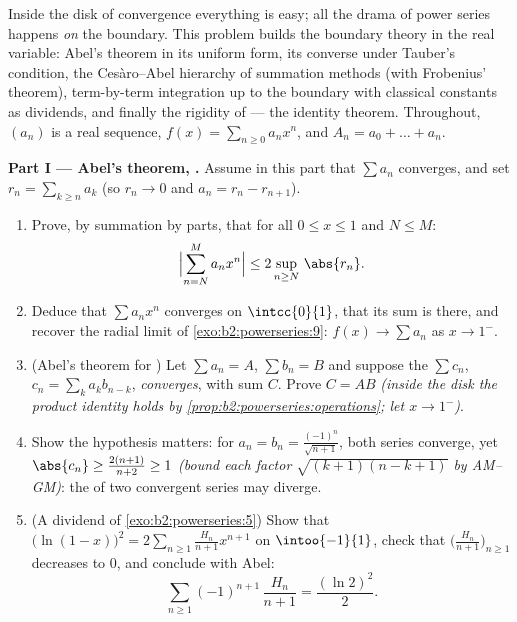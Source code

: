 \begin{problem}\label{pb:b2:powerseries:1}
Inside the disk of convergence everything is easy; all the
drama of power series happens \emph{on} the boundary. This
problem builds the boundary theory in the real variable: Abel's
theorem in its uniform form, its converse under Tauber's
condition, the Ces\`aro--Abel hierarchy of summation methods
(with Frobenius' theorem), term-by-term integration up to the
boundary with classical constants as dividends, and finally the
rigidity of  --- the identity
theorem.
Throughout, $(a_n)$ is a real sequence, $f(x) = \sum_{n\geq0}
a_nx^n$, and $A_n = a_0 + \dots + a_n$.

\medskip
\noindent\textbf{Part I --- Abel's theorem, .} Assume
in this part that $\sum a_n$ converges, and set $r_n =
\sum_{k\geq n} a_k$ (so $r_n \to 0$ and $a_n = r_n -
r_{n+1}$).
\begin{enumerate}
  \item Prove, by summation by parts, that for all $0 \leq x
        \leq 1$ and $N \leq M$:
        \[
        \Bigl|\sum_{n=N}^{M} a_n x^n\Bigr|
        \leq 2\sup_{n \geq N}\,\abs{r_n} .
        \]
  \item Deduce that $\sum a_nx^n$ converges \emph{} on
        $\intcc{0}{1}$, that its sum is  there, and
        recover the radial limit of
        \cref{exo:b2:powerseries:9}: $f(x) \to \sum a_n$ as $x
        \to 1^-$.
  \item (Abel's theorem for ) Let $\sum a_n = A$,
        $\sum b_n = B$ and suppose the  $\sum
        c_n$, $c_n = \sum_{k} a_kb_{n-k}$, \emph{converges},
        with sum $C$. Prove $C = AB$ \emph{(inside the disk the
        product identity holds by
        \cref{prop:b2:powerseries:operations}; let $x \to
        1^-$)}.
  \item Show the hypothesis matters: for $a_n = b_n =
        \frac{(-1)^n}{\sqrt{n+1}}$, both series converge, yet
        $\abs{c_n} \geq \frac{2(n+1)}{n+2} \geq 1$ \emph{(bound
        each factor $\sqrt{(k+1)(n-k+1)}$ by AM--GM)}: the
         of two convergent series may diverge.
  \item (A dividend of \cref{exo:b2:powerseries:5}) Show that
        $\bigl(\ln(1-x)\bigr)^2 = 2\sum_{n\geq1}
        \frac{H_n}{n+1}x^{n+1}$ on $\intoo{-1}{1}$, check that
        $\bigl(\frac{H_n}{n+1}\bigr)_{n\geq1}$ decreases to
        $0$, and conclude with Abel:
        \[
        \sum_{n\geq1} (-1)^{n+1}\,\frac{H_n}{n+1}
        = \frac{(\ln 2)^2}{2} .
        \]
\end{enumerate}


\end{problem}
